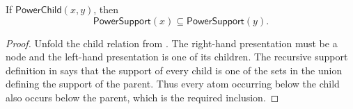 \begin{lemma}
If $\mathsf{PowerChild}(x,y)$, then
\[
\mathsf{PowerSupport}(x)\subseteq\mathsf{PowerSupport}(y).
\]
\end{lemma}
\begin{proof}
Unfold the child relation from .  The right-hand
presentation must be a node and the left-hand presentation is one of its
children.  The recursive support definition in  says
that the support of every child is one of the sets in the union defining the
support of the parent.  Thus every atom occurring below the child also occurs
below the parent, which is the required inclusion.
\end{proof}
